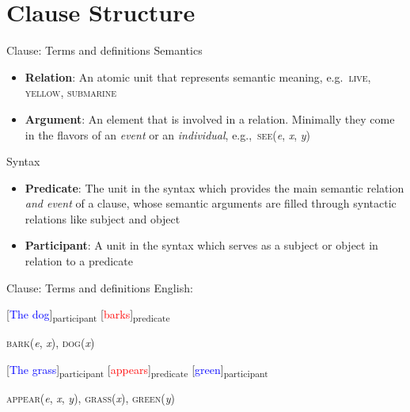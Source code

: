 \section{Clause Structure}

\begin{frame}{Clause: Terms and definitions}
Semantics
\begin{itemize}
\item \textbf{Relation}: An atomic unit that represents semantic meaning, e.g.\ \textsc{live}, \textsc{yellow}, \textsc{submarine}
\item \textbf{Argument}: An element that is involved in a relation. Minimally they come in the flavors of an \textit{event} or an \textit{individual}, e.g.,\ \textsc{see}(\textit{e}, \textit{x}, \textit{y})
\end{itemize}
Syntax
\begin{itemize}
\item \textbf{Predicate}: The unit in the syntax which provides the main semantic relation \textit{and event} of a clause, whose semantic arguments are filled through syntactic relations like subject and object
\item \textbf{Participant}: A unit in the syntax which serves as a subject or object in relation to a predicate
\end{itemize}
\end{frame}

\begin{frame}{Clause: Terms and definitions}
English:

\ex[exno=1] \label{ex:dogbarks}
[\textcolor{blue}{The dog}]\textsubscript{participant} [\textcolor{red}{barks}]\textsubscript{predicate}
\xe

\pause

\hspace{20pt} \textsc{bark}(\textit{e}, \textit{x}), \textsc{dog}(\textit{x})

\pause

\ex[exno=2] \label{ex:grassgreen}
[\textcolor{blue}{The grass}]\textsubscript{participant} [\textcolor{red}{appears}]\textsubscript{predicate} [\textcolor{blue}{green}]\textsubscript{participant}
\xe


\pause

\hspace{20pt} \textsc{appear}(\textit{e}, \textit{x}, \textit{y}), \textsc{grass}(\textit{x}), \textsc{green}(\textit{y})

\end{frame}

